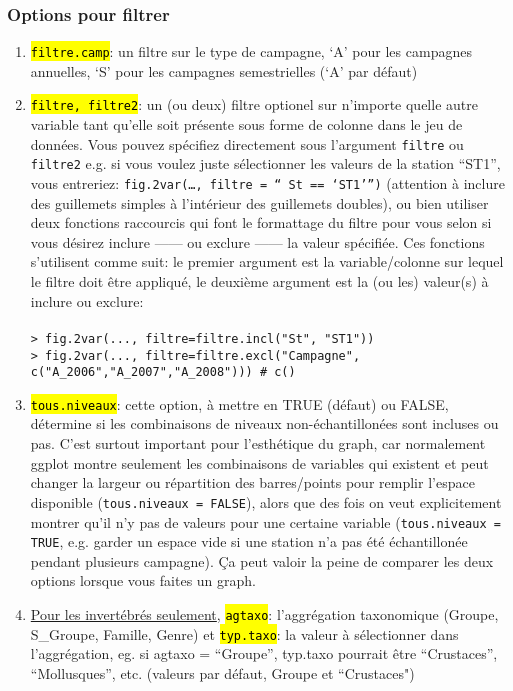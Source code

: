 \documentclass[12pt]{article}
\begin{document}
\subsubsection{Options pour filtrer}
\begin{enumerate}

\item \hl{\texttt{filtre.camp}}: un filtre sur le type de campagne, `A' pour les campagnes annuelles, `S' pour les campagnes semestrielles (`A' par défaut)

\item \hl{\texttt{filtre, filtre2}}: un (ou deux) filtre optionel sur n'importe quelle autre variable tant qu'elle soit présente sous forme de colonne dans le jeu de données. Vous pouvez spécifiez directement sous l'argument \texttt{filtre} ou \texttt{filtre2} e.g. si vous voulez juste sélectionner les valeurs de la station “ST1”, vous entreriez: \texttt{fig.2var(…, filtre = “ St == ‘ST1’”)} (attention à inclure des guillemets simples à l'intérieur des guillemets doubles), ou bien utiliser deux fonctions raccourcis qui font le formattage du filtre pour vous selon si vous désirez inclure ------ ou exclure ------ la valeur spécifiée. Ces fonctions s'utilisent comme suit: le premier argument est la variable/colonne sur lequel le filtre doit être appliqué, le deuxième argument est la (ou les) valeur(s) à inclure ou exclure: \\
\\
\texttt{> fig.2var(..., filtre=filtre.incl("St", "ST1"))\\
> fig.2var(..., filtre=filtre.excl("Campagne", c("A\_2006","A\_2007","A\_2008"))) \# c()
}
\item \hl{\texttt{tous.niveaux}}: cette option, à mettre en TRUE (défaut) ou FALSE, détermine si les combinaisons de niveaux non-échantillonées sont incluses ou pas. C'est surtout important pour l’esthétique du graph, car normalement ggplot montre seulement les combinaisons de variables qui existent et peut changer la largeur ou répartition des barres/points pour remplir l’espace disponible (\texttt{tous.niveaux = FALSE}), alors que des fois on veut explicitement montrer qu’il n’y pas de valeurs pour une certaine variable (\texttt{tous.niveaux = TRUE}, e.g. garder un espace vide si une station n’a pas été échantillonée pendant plusieurs campagne). Ça peut valoir la peine de comparer les deux options lorsque vous faites un graph.
\item \underline{Pour les invertébrés seulement}, \hl{\texttt{agtaxo}}: l’aggrégation taxonomique (Groupe, S\_Groupe, Famille, Genre) et \hl{\texttt{typ.taxo}}: la valeur à sélectionner dans l’aggrégation, eg. si agtaxo = ``Groupe”, typ.taxo pourrait être ``Crustaces”, ``Mollusques”, etc. (valeurs par défaut, Groupe et ``Crustaces")

\end{enumerate}
\end{document}
